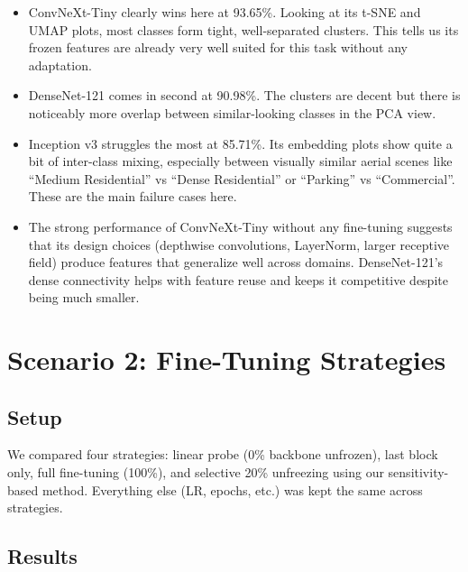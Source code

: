 \documentclass[11pt,a4paper]{article}
\begin{document}
\begin{itemize}
  \item ConvNeXt-Tiny clearly wins here at 93.65\%. Looking at its t-SNE and UMAP plots, most classes form tight, well-separated clusters. This tells us its frozen features are already very well suited for this task without any adaptation.
  \item DenseNet-121 comes in second at 90.98\%. The clusters are decent but there is noticeably more overlap between similar-looking classes in the PCA view.
  \item Inception v3 struggles the most at 85.71\%. Its embedding plots show quite a bit of inter-class mixing, especially between visually similar aerial scenes like ``Medium Residential'' vs ``Dense Residential'' or ``Parking'' vs ``Commercial''. These are the main failure cases here.
  \item The strong performance of ConvNeXt-Tiny without any fine-tuning suggests that its design choices (depthwise convolutions, LayerNorm, larger receptive field) produce features that generalize well across domains. DenseNet-121's dense connectivity helps with feature reuse and keeps it competitive despite being much smaller.
\end{itemize}

\section{Scenario 2: Fine-Tuning Strategies}

\subsection{Setup}
We compared four strategies: linear probe (0\% backbone unfrozen), last block only, full fine-tuning (100\%), and selective 20\% unfreezing using our sensitivity-based method.
Everything else (LR, epochs, etc.) was kept the same across strategies.

\subsection{Results}
\end{document}
